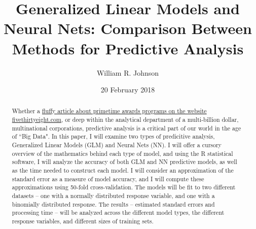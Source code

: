 \documentclass[12pt]{article}
\begin{document}
	\title{Generalized Linear Models and Neural Nets: Comparison Between Methods for Predictive Analysis}
	\author{William R. Johnson}
	\date{20 February 2018}
	\maketitle

	\renewcommand{\abstractname}{Abstract:}
	\begin{abstract}
		Whether a \href{https://fivethirtyeight.com/features/oscars-2018-early-predictions-nominations/}{fluffy article about primetime 
awards programs on the website fivethirtyeight.com}, or deep within the analytical 
department of a multi-billion dollar, multinational corporations, predictive analysis is a critical part of our world in the age of ``Big Data".  
In this paper, I will examine two types of predicitive analysis, Generalized Linear Models (GLM) and Neural Nets (NN).  I will offer a cursory 
overview of the mathematics behind each type of model, and using the R statistical software, I will analyze the accuracy of both GLM and NN 
predictive models, as well as the time needed to construct each model. I will consider an approximation of the standard error as a measure of model 
accuracy, and I will compute these approximations using 50-fold cross-validation.  The models will be fit to two different datasets -- one with a 
normally distributed response variable, and one with a binomially distributed response.  The results -- estimated standard errors and processing 
time -- will be analyzed across the different model types, the different response variables, and different sizes of training sets.
	\end{abstract}
	\vfill\eject



\end{document}
